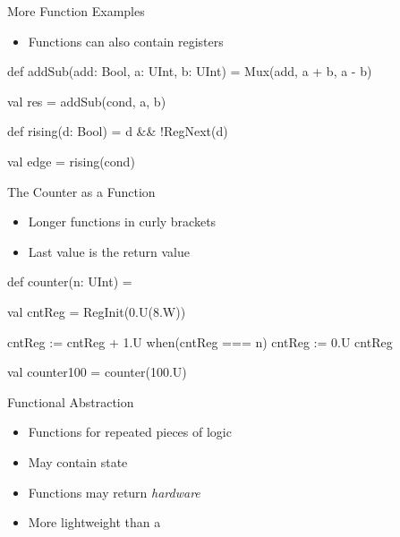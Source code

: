\begin{frame}[fragile]{More Function Examples}
\begin{itemize}
\item Functions can also contain registers
\end{itemize}
\begin{chisel}
  def addSub(add: Bool, a: UInt, b: UInt) =
    Mux(add, a + b, a - b)

  val res = addSub(cond, a, b)

  def rising(d: Bool) = d && !RegNext(d)

  val edge = rising(cond)
\end{chisel}
\end{frame}

\begin{frame}[fragile]{The Counter as a Function}
\begin{itemize}
\item Longer functions in curly brackets
\item Last value is the return value
\end{itemize}
\begin{chisel}
def counter(n: UInt) = {
  
  val cntReg = RegInit(0.U(8.W))
  
  cntReg := cntReg + 1.U
  when(cntReg === n) {
    cntReg := 0.U
  }
  cntReg
}

val counter100 = counter(100.U)
\end{chisel}
\end{frame}

\begin{frame}[fragile]{Functional Abstraction}
\begin{itemize}
\item Functions for repeated pieces of logic
\item May contain state
\item Functions may return \emph{hardware}
\item More lightweight than a 
\end{itemize}
\end{frame}


